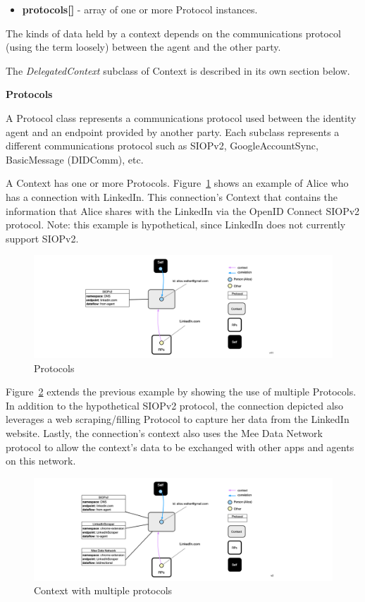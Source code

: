 \documentclass[11pt, oneside]{article}   	%
\begin{document}
\begin{itemize}
\item \textbf{protocols[]} - array of one or more Protocol instances.
\end{itemize}

The kinds of data held by a context depends on the communications protocol (using the term loosely) between the agent and the other party. 

The \emph{DelegatedContext} subclass of Context is described in its own section below.

\textbf{Protocols}

A Protocol class represents a communications protocol used between the identity agent and an endpoint provided by another party. Each subclass represents a different communications protocol such as SIOPv2, GoogleAccountSync, BasicMessage (DIDComm), etc.  

A Context has one or more Protocols. Figure~\ref{fig:protocol} shows an example of Alice who has a connection with LinkedIn. This connection's Context that contains the information that Alice shares with the LinkedIn via the OpenID Connect SIOPv2 protocol. Note: this example is hypothetical, since LinkedIn does not currently support SIOPv2.

\begin{figure}[htbp]
	\includegraphics[width=\textwidth]{./images/context-with-protocol.png}
	\caption{Protocols}
	\label{fig:protocol}
\end{figure}

Figure~\ref{fig:n-protocols} extends the previous example by showing the use of multiple Protocols. In addition to the hypothetical SIOPv2 protocol, the connection depicted also leverages a web scraping/filling Protocol to capture her data from the LinkedIn website. Lastly, the connection's context also uses the Mee Data Network protocol to allow the context's data to be exchanged with other apps and agents on this  network. 

\begin{figure}[htbp]
	\includegraphics[width=\textwidth]{./images/context-with-n-protocols.png}
	\caption{Context with multiple protocols}
	\label{fig:n-protocols}
\end{figure}
\end{document}
